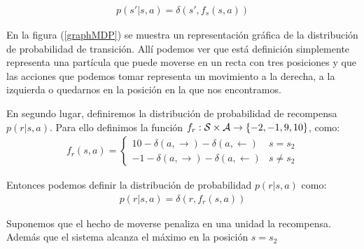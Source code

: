 \begin{example}
    \begin{gather}\label{deltas}
        p(s'|s,a) = \delta(s',f_s(s,a))
    \end{gather}

    En la figura (\ref{graphMDP}) se muestra un representación gráfica de la distribución de probabilidad de transición. Allí podemos ver que está definición simplemente representa una partícula que puede moverse en un recta con tres posiciones y que las acciones que podemos tomar representa un movimiento a la derecha, a la izquierda o quedarnos en la posición en la que nos encontramos. \newline

    En segundo lugar, definiremos la distribución de probabilidad de recompensa $p(r|s,a)$. Para ello definimos la función $f_r:\mathcal{S} \times \mathcal{A} \rightarrow \{-2,-1,9,10\}$, como:
    \begin{gather}
        f_r(s,a) = 
        \begin{cases}
            10 - \delta(a,\rightarrow) - \delta(a,\leftarrow) & s = s_2      \\
            -1 - \delta(a,\rightarrow) - \delta(a,\leftarrow) & s \neq s_2
        \end{cases}
    \end{gather}

    Entonces podemos definir la distribución de probabilidad $p(r|s,a)$ como:
    \begin{gather}\label{deltar}
        p(r|s,a) = \delta(r,f_r(s,a)) 
    \end{gather}
    
    Suponemos que el hecho de moverse penaliza en una unidad la recompensa. Además que el sistema alcanza el máximo en la posición $s=s_2$
        


\end{example}

